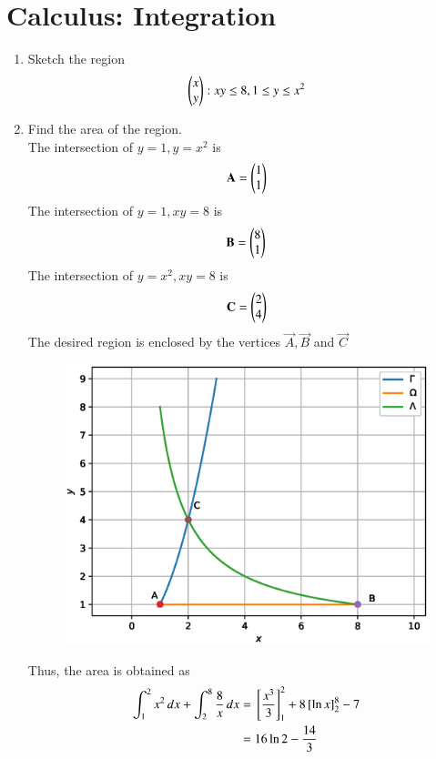 \documentclass[journal,12pt,twocolumn]{IEEEtran}
\renewcommand\thesection{\arabic{section}}
\begin{document}
\section{Calculus: Integration}
\begin{enumerate}[label=\thesection.\arabic*
,ref=\thesection.\theenumi]

\item Sketch the region 
\begin{align}
\begin{pmatrix}x \\ y\end{pmatrix}: xy \le 8, 1\le y \le x^2
\end{align}
%
\item Find the area of the region.
\\ 
\solution The intersection of $y = 1, y = x^2$ is
\begin{align}
\mathbf{A} = \begin{pmatrix}1 \\ 1\end{pmatrix}
\end{align}
The intersection of $y = 1, xy = 8$ is
\begin{align}
\mathbf{B} = \begin{pmatrix}8 \\ 1\end{pmatrix}
\end{align}
The intersection of $y = x^2, xy = 8$ is
\begin{align}
\mathbf{C} = \begin{pmatrix}2 \\ 4\end{pmatrix}
\end{align}
%
The desired region is enclosed by the vertices $\vec{A},\vec{B}$ and 
$\vec{C}$
\begin{figure}
\centering
\includegraphics[width=\columnwidth]{./figs/2019_4.eps}
\caption{}
\label{fig:2019_4}
\end{figure}
%
Thus, the area is obtained as
\begin{align}
\int_{1}^{2}x^2\,dx + \int_{2}^{8}\frac{8}{x}\,dx
&= {}\left[\frac{x^3}{3}\right]_{1}^{2}+8 {}\left[\ln x\right]_{2}^{8} - 7
\\
&= 16 \ln 2 - \frac{14}{3}
\end{align}
\end{enumerate}
\end{document}
